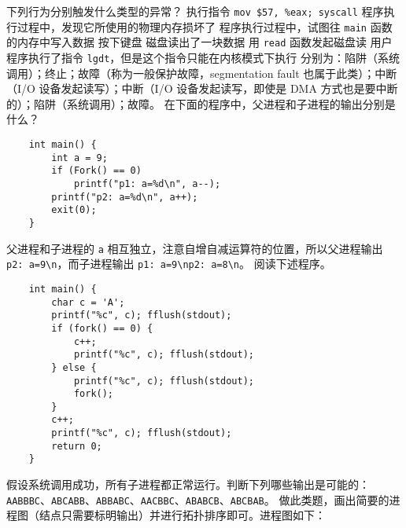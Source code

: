 \begin{problems}
\begin{table}[H]
\begin{tabular}{|c|c|ccc|}
            \end{tabular}
        \end{table}
        \pro 下列行为分别触发什么类型的异常？
            \qn 执行指令 \verb|mov $57, %eax; syscall|
            \qn 程序执行过程中，发现它所使用的物理内存损坏了
            \qn 程序执行过程中，试图往 \verb|main| 函数的内存中写入数据
            \qn 按下键盘
            \qn 磁盘读出了一块数据
            \qn 用 \verb|read| 函数发起磁盘读
            \qn 用户程序执行了指令 \verb|lgdt|，但是这个指令只能在内核模式下执行
        \sol 分别为：陷阱（系统调用）；终止；故障（称为一般保护故障，segmentation fault 也属于此类）；中断（I/O 设备发起读写）；中断（I/O 设备发起读写，即使是 DMA 方式也是要中断的）；陷阱（系统调用）；故障。
        \pro 在下面的程序中，父进程和子进程的输出分别是什么？
        \begin{verbatim}
    int main() {
        int a = 9;
        if (Fork() == 0)
            printf("p1: a=%d\n", a--);
        printf("p2: a=%d\n", a++);
        exit(0);
    }
        \end{verbatim}
        \sol 父进程和子进程的 \verb|a| 相互独立，注意自增自减运算符的位置，所以父进程输出 \verb|p2: a=9\n|，而子进程输出 \verb|p1: a=9\np2: a=8\n|。
        \pro 阅读下述程序。
        \begin{verbatim}
    int main() {
        char c = 'A';
        printf("%c", c); fflush(stdout);
        if (fork() == 0) {
            c++;
            printf("%c", c); fflush(stdout);
        } else {
            printf("%c", c); fflush(stdout);
            fork();
        }
        c++;
        printf("%c", c); fflush(stdout);
        return 0;
    }
        \end{verbatim}
        假设系统调用成功，所有子进程都正常运行。判断下列哪些输出是可能的：\verb|AABBBC|、\verb|ABCABB|、\verb|ABBABC|、\verb|AACBBC|、\verb|ABABCB|、\verb|ABCBAB|。
        \sol 做此类题，画出简要的进程图（结点只需要标明输出）并进行拓扑排序即可。进程图如下：
        \begin{figure}[H]
            \small
            \tt
            \centering
\end{figure}
\end{problems}
